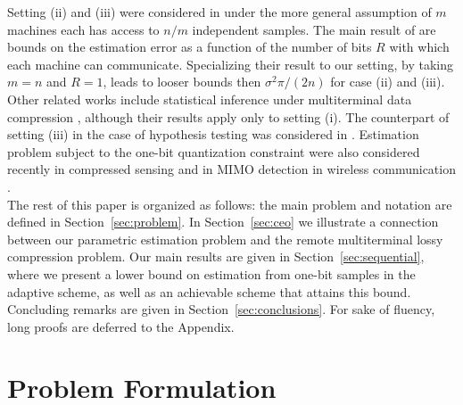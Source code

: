 \documentclass[letterpaper, conference]{IEEEtran}      %
\begin{document}
Setting (ii) and (iii) were considered in 
\cite{zhang2013information} under the more general assumption of $m$ machines each has access to $n/m$ independent samples. The main result of \cite{zhang2013information} are bounds on the estimation error as a function of the number of bits $R$ with which each machine can communicate. Specializing their result to our setting, by taking $m=n$ and $R=1$, leads to looser bounds then $\sigma^2\pi/(2n)$ for case (ii) and (iii). 
Other related works include statistical inference under multiterminal data compression \cite{han1987hypothesis, zhang1988estimation}, although their results apply only to setting (i). The counterpart of setting (iii) in the case of hypothesis testing was considered in \cite{52470}.
%
Estimation problem subject to the one-bit quantization constraint were also considered recently in compressed sensing \cite{boufounos20081,baraniuk2017exponential} and in MIMO detection in wireless communication \cite{singh2009limits}. \\

The rest of this paper is organized as follows: the main problem and notation are defined in Section~\ref{sec:problem}. In Section~\ref{sec:ceo} we illustrate a connection between our parametric estimation problem and the remote multiterminal lossy compression problem. Our main results are given in  Section~\ref{sec:sequential}, where we present a lower bound on estimation from one-bit samples in the adaptive scheme, as well as an achievable scheme that attains this bound. Concluding remarks are given in Section~\ref{sec:conclusions}. For sake of fluency, long proofs are deferred to the Appendix.

\section{Problem Formulation \label{sec:problem}}
\end{document}
